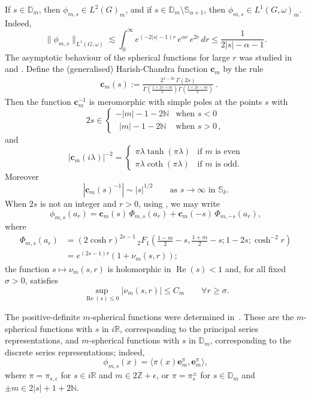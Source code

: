 \documentclass[12pt,a4paper]{amsart}
\theoremstyle{definition}
\theoremstyle{remark}
\numberwithin{equation}{section}
\newcommand{\R}{\mathbb{R}}
\newcommand{\N}{\mathbb{N}}
\newcommand{\Z}{\mathbb{Z}}
\renewcommand{\Re}{\operatorname{Re}}
\newcommand{\Strip}{\mathbb{S}}
\newcommand{\Discr}{\mathbb{D}_m}
\newcommand{\bfc}{\mathbf{c}_m}
\def\be{\begin{equation}}
\def\ee{\end{equation}}
\newcommand{\eb}{\mathbf{e}}
\newcommand{\var}{s}
\begin{document}
If $\var\in \Discr$, then $\phi_{m,\var}\in L^2(G)_m$,
and if $\var\in \Discr\setminus\Strip_{\alpha+1}$, then $\phi_{m,\var}\in L^1(G,\omega)_m$.
Indeed,
\be\label{e:stimaphi}
\|\phi_{m,\var}\|_{L^1(G,\omega)}
\lesssim \int_0^\infty e^{(-2|\var|-1)r}\,e^{\alpha r}\,e^{2r}\, dr \leq \frac1{2|\var|-\alpha-1}.
\ee
The asymptotic behaviour of the spherical functions for large $r$ was studied in~\cite[p.~53]{Koo} and \cite[Lemma~4.7]{RW}.
Define  the (generalised) Harish-Chandra function $\bfc$ by the rule
\begin{align*}
&\bfc(\var) := \frac{2^{1-2\var}\,
\Gamma\left(2\var\right)
}{
\Gamma\left(\frac{1+2\var+m}{2}\right)\Gamma\left(\frac{1+2\var-m}{2}\right)
}\ .
\end{align*}
Then the function $\bfc^{-1}$ is meromorphic with simple poles at the points $\var$ with
\[
2\var\in 
\begin{cases} 
-|m|-1-2\N &\text{when $s < 0$} 
\\[3pt]
 \ \ |m|-1-2\N &\text{when $s > 0$}\, ,
 \end{cases}
\]
and
\[
|\bfc(i\lambda)|^{-2}
=
\begin{cases}
\pi\lambda  \tanh (\pi\lambda) &\text{if $m$ is even}
\\[3pt]
\pi\lambda \coth (\pi\lambda)&\text{if  $m$  is odd}.
\end{cases}
\]
\color{black}
Moreover
\be\label{stimaHC}
|\bfc(\var)^{-1} |\sim |\var|^{1/2} 
\qquad \text{as $\var \to \infty$ in $\Strip_\delta$}.
\ee
When $2\var$ is not an integer and $r > 0$, using \cite[2.10 (3)]{ErdI}, we may write 
\be\label{PHI}
\phi_{m,\var}(a_r)=\mathbf{c}_m(\var)\,\Phi_{m,\var}(a_r)+\mathbf{c}_m(-\var)\,\Phi_{m,-\var}(a_r) ,
\ee
where 
\begin{align*}
\Phi_{m,\var}(a_r)&= (2\cosh r)^{2\var-1}\,
{{}_2F_1}\left(\tfrac{1-m}{2}-\var,\tfrac{1+m}{2}-\var;1-2\var;\cosh^{-2} r\right) 
\\&=e^{(2\var-1)r}(1+\nu_m(\var,r)) ;
\end{align*}
the function $\var\mapsto \nu_m(\var,r)$ is holomorphic in $\Re(\var)<1$ and, for all fixed $\sigma>0$, satisfies 
\be\label{stima_nu}
 \sup_{\Re (\var)\leq 0}|\nu_m(\var,r)|\leq C_m  \qquad  \forall r\geq \sigma.
\ee   
 
 
The positive-definite $m$-spherical functions were determined in~\cite{T}.
These are the $m$-spherical functions with $\var$ in $i \R $, corresponding to the principal series representations, and $m$-spherical functions with $\var$ in $\Discr$,  corresponding to the discrete series representations; indeed,
\begin{equation}\label{e:sfer-repr}
\phi_{m,\var}(x)=\langle \pi(x)\eb^{\pi}_m,\eb^{\pi}_m\rangle ,
\end{equation}
where
$\pi= \pi_{\var,\epsilon}$ for $\var\in i\R$ and $m \in 2\Z + \epsilon$, or
$\pi=  \pi_{\var}^\pm$ for $s\in \Discr$ and $\pm m \in 2|s|+ 1 + 2\N$.
\end{document}
